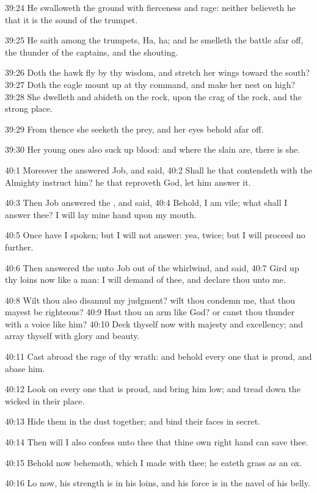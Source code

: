 39:24 He swalloweth the ground with fierceness and rage: neither believeth he that it is the sound of the trumpet.

39:25 He saith among the trumpets, Ha, ha; and he smelleth the battle afar off, the thunder of the captains, and the shouting.

39:26 Doth the hawk fly by thy wisdom, and stretch her wings toward the south?  39:27 Doth the eagle mount up at thy command, and make her nest on high?  39:28 She dwelleth and abideth on the rock, upon the crag of the rock, and the strong place.

39:29 From thence she seeketh the prey, and her eyes behold afar off.

39:30 Her young ones also suck up blood: and where the slain are, there is she.

40:1 Moreover the \LORD answered Job, and said, 40:2 Shall he that contendeth with the Almighty instruct him? he that reproveth God, let him answer it.

40:3 Then Job answered the \LORD, and said, 40:4 Behold, I am vile; what shall I answer thee? I will lay mine hand upon my mouth.

40:5 Once have I spoken; but I will not answer: yea, twice; but I will proceed no further.

40:6 Then answered the \LORD unto Job out of the whirlwind, and said, 40:7 Gird up thy loins now like a man: I will demand of thee, and declare thou unto me.

40:8 Wilt thou also disannul my judgment? wilt thou condemn me, that thou mayest be righteous?  40:9 Hast thou an arm like God? or canst thou thunder with a voice like him?  40:10 Deck thyself now with majesty and excellency; and array thyself with glory and beauty.

40:11 Cast abroad the rage of thy wrath: and behold every one that is proud, and abase him.

40:12 Look on every one that is proud, and bring him low; and tread down the wicked in their place.

40:13 Hide them in the dust together; and bind their faces in secret.

40:14 Then will I also confess unto thee that thine own right hand can save thee.

40:15 Behold now behemoth, which I made with thee; he eateth grass as an ox.

40:16 Lo now, his strength is in his loins, and his force is in the navel of his belly.

